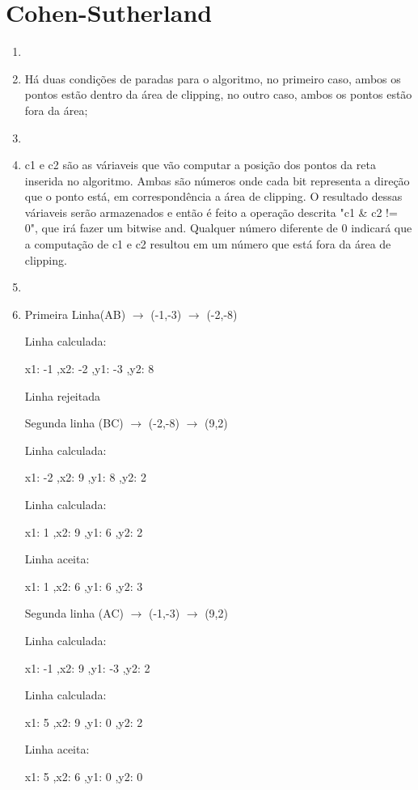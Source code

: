 \section*{Cohen-Sutherland}

	\begin{enumerate}\addtocounter{enumi}{21}
		\item 
		
		\item 
		Há duas condições de paradas para o algoritmo, no primeiro caso, ambos os pontos
		estão dentro da área de clipping, no outro caso, ambos os pontos estão fora da área;
		\item
		
		\item 
		c1 e c2 são as váriaveis que vão computar a posição dos pontos da reta
		inserida no algoritmo. Ambas são números onde cada bit representa a direção
		 que o ponto está, em correspondência a área de clipping. O resultado dessas váriaveis
		 serão armazenados e então é feito a operação descrita "c1 \& c2 != 0", que irá fazer um 
		 bitwise and. Qualquer número diferente de 0 indicará que a computação de c1 e c2 resultou
		 em um número que está fora da área de clipping.
		
		\item 
		
		\item 

		Primeira Linha(AB) $\rightarrow$ (-1,-3) $\rightarrow$ (-2,-8)
		
		Linha calculada: 
		
		 x1: -1 ,x2: -2 ,y1: -3 ,y2: 8

		Linha rejeitada

		Segunda linha (BC) $\rightarrow$ (-2,-8) $\rightarrow$ (9,2)

		Linha calculada: 
		
 		x1: -2 ,x2: 9 ,y1: 8 ,y2: 2

		Linha calculada: 
		
		 x1: 1 ,x2: 9 ,y1: 6 ,y2: 2

		Linha aceita: 
		
 		x1: 1 ,x2: 6 ,y1: 6 ,y2: 3
 		
 		Segunda linha (AC) $\rightarrow$ (-1,-3) $\rightarrow$ (9,2)

		Linha calculada: 
		
 		x1: -1 ,x2: 9 ,y1: -3 ,y2: 2

		Linha calculada: 
		
		x1: 5 ,x2: 9 ,y1: 0 ,y2: 2

		Linha aceita: 
		
		x1: 5 ,x2: 6 ,y1: 0 ,y2: 0
		
	\end{enumerate}
